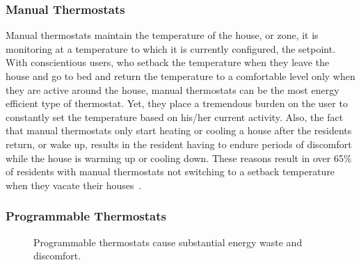 \subsubsection{Manual Thermostats}
Manual thermostats maintain the temperature of the house, or zone, it is
monitoring at a temperature to which it is currently configured, the
setpoint. With conscientious users, who setback the temperature when they leave
the house and go to bed and return the temperature to a comfortable level only
when they are active around the house, manual thermostats can be the most energy
efficient type of thermostat. Yet, they place a tremendous burden on the user to
constantly set the temperature based on his/her current activity. Also, the fact
that manual thermostats only start heating or cooling a house after the
residents return, or wake up, results in the resident having to endure periods
of discomfort while the house is warming up or cooling down. These reasons
result in over 65\% of residents with manual thermostats not switching to a
setback temperature when they vacate their houses~\cite{manualSetback}.

\subsubsection{Programmable Thermostats}
\begin{figure}[t]
 \caption[Drawbacks of Programmable Thermostats]{Programmable thermostats cause substantial energy waste and
  discomfort.} 
\label{fig:overviewScheduled}
\end{figure}
  
